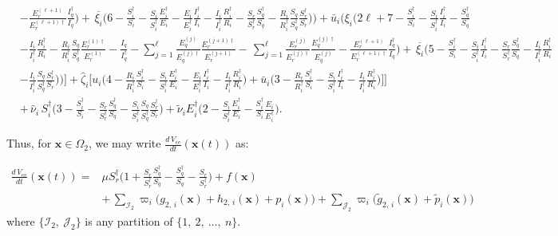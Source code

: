 \documentclass[a4paper]{article}
\newcommand{\dsum}{\displaystyle\sum}
\begin{document}
\begin{align}
&-\frac{E^{(\ell+1)}_r}{E^{(\ell+1)\dagger }_r}\frac{I^\dagger _q}{I_q}  \Big) + \,\overline{\xi_i}\Big(6  -\frac{S^\dagger _i}{S_i} -\frac{S_i}{S^\dagger _i}\frac{E^\dagger _i}{E_i} - \frac{E_i}{E^\dagger_i}\frac{I^\dagger_i}{I_i} - \frac{I_i}{I^\dagger_i}\frac{R^\dagger_i}{R_i}  -\frac{S_r}{S^\dagger _r}\frac{S^\dagger _q}{S_q}-\frac{R_i}{R^\dagger _i}\frac{S_q}{S^\dagger _q}\frac{S^\dagger _r}{S_r}\Big)\Big) + \bar u_i\Big(\xi_i\Big(2\ell+7 -\frac{S^\dagger _i}{S_i}-\frac{S_i}{S^\dagger _i} \frac{I^\dagger_i}{I_i}  -\frac{S^\dagger _q}{S_q}\nonumber\\
& - \frac{I_i}{I^\dagger_i}\frac{R^\dagger_i}{R_i} - \frac{R_i}{R^\dagger _i}\frac{S_q}{S^\dagger _q}\frac{E^{(1)\dagger }_r}{E^{(1)}_r}-\frac{I_q}{I^\dagger _q}- {\dsum_{j=1}^{\ell}}\frac{E^{(j)}_q}{E^{(j)\dagger }_q}\frac{E^{(j+1)\dagger }_r}{E^{(j+1)}_r}-\, {\dsum_{j=1}^{\ell}}\frac{ E^{(j)}_r}{ E^{(j)\dagger }_r}\frac{E^{(j)\dagger }_q}{E^{(j)}_q} -\frac{E^{(\ell+1)}_r}{E^{(\ell+1)\dagger }_r}\frac{I^\dagger _q}{I_q}  \Big) + \,\overline{\xi_i}\Big(5 - \frac{S^\dagger _i}{S_i} -\frac{S_i}{S^\dagger _i}\frac{I^\dagger_i}{I_i} -\frac{S_r}{S^\dagger _r}\frac{S^\dagger _q}{S_q} - \frac{I_i}{I^\dagger_i}\frac{R^\dagger_i}{R_i}\nonumber\\& -\frac{I_i}{I^\dagger _i}\frac{S_q}{S^\dagger _q}\frac{S^\dagger _r}{S_r}\Big)\Big)\Big] + \hat\zeta_i\Big[u_i\Big(4  - \frac{R_i}{R^\dagger _i} \frac{S^\dagger _i}{S_i} - \frac{S_i}{S^\dagger_i}\frac{E^\dagger_i}{E_i} - \frac{E_i}{E^\dagger_i}\frac{I^\dagger_i}{I_i} - \frac{I_i}{I^\dagger_i}\frac{R^\dagger_i}{R_i} \Big) + \bar u_i\Big(3  - \frac{R_i}{R^\dagger _i} \frac{S^\dagger _i}{S_i} - \frac{S_i}{S^\dagger_i}\frac{I^\dagger_i}{I_i}  - \frac{I_i}{I^\dagger_i}\frac{R^\dagger_i}{R_i} \Big)\Big] \Bigg] \nonumber\\& +\,\hat\nu_i\,S_i^\dagger  \Big( 3-\frac{S^\dagger _i}{S_i} - \frac{S_r}{S^\dagger _r}\frac{S^\dagger _q}{S_q}-\frac{S_i}{S^\dagger _i}\frac{S_q}{S^\dagger _q}\frac{S^\dagger _r}{S_r}\Big) + \widetilde\nu_iE^\dagger_i\Big(2-\frac{S_i}{S^\dagger_i}\frac{E^\dagger_i}{E_i} - \frac{S^\dagger_i}{S_i} \frac{E_i}{E^\dagger_i}\Big).
\end{align}


\noindent Thus, for $\mathbf x\in\Omega_2$, we may write $\frac{d\,V_{ee}}{dt}(\mathbf x(t))$ as: 

\begin{align}
\frac{d\,V_{ee}}{dt}(\mathbf x(t)) =& \mu S_r^\dagger\Big(1 + \frac{S_r}{S^\dagger_r}\frac{S^\dagger_q}{S_q} - \frac{S^\dagger_q}{S_q} - \frac{S_r}{S^\dagger_r}\Big) + f(\mathbf x)\nonumber\\& +\, \dsum_{\mathcal I_2}\varpi_i\Big(g_{2,\,i}(\mathbf x)+h_{2,\,i}(\mathbf x)+p_{i}(\mathbf x)\Big)+ \dsum_{\mathcal J_2}\varpi_i\Big(\widetilde g_{2,\,i}(\mathbf x) + \widetilde p_{i}(\mathbf x)\Big)\label{eq:rdcexp2vee}
\end{align} where $\{\mathcal I_2,~\mathcal J_2\}$ is any partition of $\{1,~2,~\ldots,~n\}$.
\end{document}
